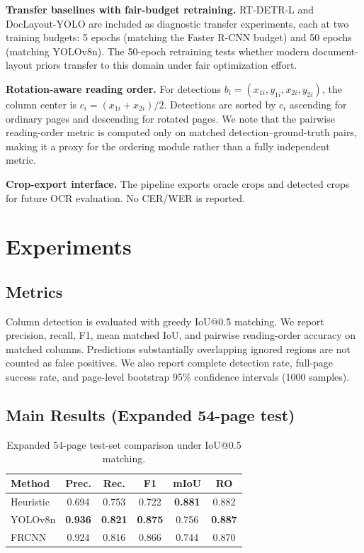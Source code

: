 \documentclass[5p,times,twocolumn]{elsarticle}
\begin{document}
\textbf{Transfer baselines with fair-budget retraining.} RT-DETR-L and DocLayout-YOLO are included as diagnostic transfer experiments, each at two training budgets: 5 epochs (matching the Faster R-CNN budget) and 50 epochs (matching YOLOv8n). The 50-epoch retraining tests whether modern document-layout priors transfer to this domain under fair optimization effort.

\textbf{Rotation-aware reading order.} For detections $b_i=(x_{1i},y_{1i},x_{2i},y_{2i})$, the column center is $c_i=(x_{1i}+x_{2i})/2$. Detections are sorted by $c_i$ ascending for ordinary pages and descending for rotated pages. We note that the pairwise reading-order metric is computed only on matched detection--ground-truth pairs, making it a proxy for the ordering module rather than a fully independent metric.

\textbf{Crop-export interface.} The pipeline exports oracle crops and detected crops for future OCR evaluation. No CER/WER is reported.

\section{Experiments}
\subsection{Metrics}
Column detection is evaluated with greedy IoU@0.5 matching. We report precision, recall, F1, mean matched IoU, and pairwise reading-order accuracy on matched columns. Predictions substantially overlapping ignored regions are not counted as false positives. We also report complete detection rate, full-page success rate, and page-level bootstrap 95\% confidence intervals (1000 samples).

\subsection{Main Results (Expanded 54-page test)}
\begin{table}[!ht]
\centering
\caption{Expanded 54-page test-set comparison under IoU@0.5 matching.}
\label{tab:main_results}
\begin{tabular}{lccccc}
\toprule
Method & Prec. & Rec. & F1 & mIoU & RO \\
\midrule
Heuristic & 0.694 & 0.753 & 0.722 & \textbf{0.881} & 0.882 \\
YOLOv8n & \textbf{0.936} & \textbf{0.821} & \textbf{0.875} & 0.756 & \textbf{0.887} \\
FRCNN & 0.924 & 0.816 & 0.866 & 0.744 & 0.870 \\
\bottomrule
\end{tabular}
\end{table}
\end{document}
